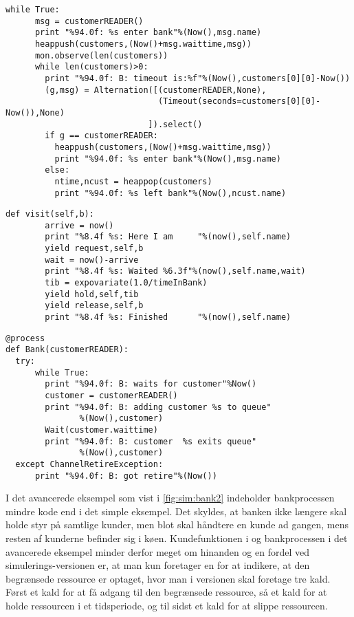 \begin{lstlisting}[firstnumber=39,float=hbtp, label=fig:sim:bank, caption= Uddrag af bank processen i simulation-versionen]
    while True:
      msg = customerREADER()
      print "%94.0f: %s enter bank"%(Now(),msg.name)
      heappush(customers,(Now()+msg.waittime,msg))
      mon.observe(len(customers))
      while len(customers)>0:
        print "%94.0f: B: timeout is:%f"%(Now(),customers[0][0]-Now())
        (g,msg) = Alternation([(customerREADER,None),
                               (Timeout(seconds=customers[0][0]- Now()),None)
                             ]).select()
        if g == customerREADER:
          heappush(customers,(Now()+msg.waittime,msg))
          print "%94.0f: %s enter bank"%(Now(),msg.name)
        else:
          ntime,ncust = heappop(customers)
          print "%94.0f: %s left bank"%(Now(),ncust.name) 
\end{lstlisting}
\begin{lstlisting}[firstnumber=20 ,float=hbtp, label=fig:simpy:customer, caption=Funktionen \code{visit} i \simpy]
     def visit(self,b):                                
        arrive = now()
        print "%8.4f %s: Here I am     "%(now(),self.name)
        yield request,self,b                          
        wait = now()-arrive
        print "%8.4f %s: Waited %6.3f"%(now(),self.name,wait)
        tib = expovariate(1.0/timeInBank)            
        yield hold,self,tib                          
        yield release,self,b                         
        print "%8.4f %s: Finished      "%(now(),self.name)
\end{lstlisting}
\begin{lstlisting}[firstnumber=33 ,float=hbtp, label=fig:sim:bank2, caption=Bankprocessen\, hvor banken er en begrænset ressource. ]
  @process
def Bank(customerREADER):
  try:
      while True:
        print "%94.0f: B: waits for customer"%Now()
        customer = customerREADER()
        print "%94.0f: B: adding customer %s to queue"
               %(Now(),customer)
        Wait(customer.waittime)
        print "%94.0f: B: customer  %s exits queue"
               %(Now(),customer)
  except ChannelRetireException:
      print "%94.0f: B: got retire"%(Now())

\end{lstlisting}
I det avancerede eksempel som vist i  \cref{fig:sim:bank2} indeholder bankprocessen mindre kode end i det simple eksempel. Det skyldes, at banken ikke længere skal holde styr på samtlige kunder, men blot skal håndtere en kunde ad gangen, mens resten af kunderne befinder sig i køen. Kundefunktionen i \simpy og bankprocessen i det avancerede eksempel minder derfor meget om hinanden og en fordel ved simulerings-versionen er, at man kun foretager en  for at indikere, at den begrænsede ressource er optaget, hvor man i \simpy versionen skal foretage tre kald. Først et kald for at få adgang til den begrænsede ressource, så et kald for at holde ressourcen i et tidsperiode, og til sidst et kald for at slippe ressourcen.
